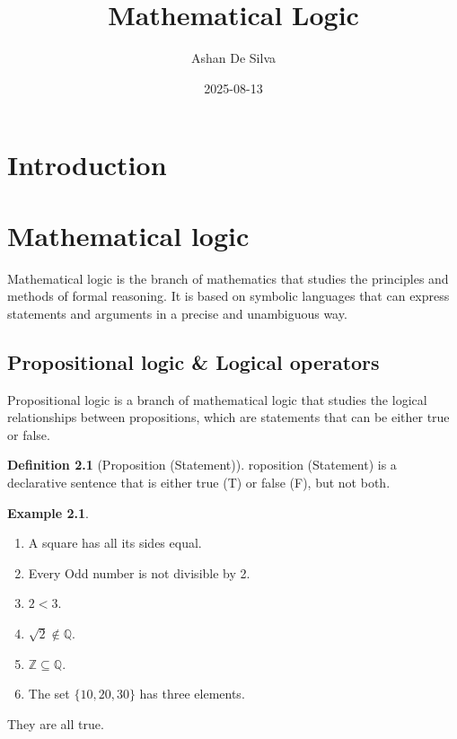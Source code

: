 \documentclass[
]{book}
\title{Mathematical Logic}
\author{Ashan De Silva}
\date{2025-08-13}
\providecommand{\tightlist}{%
  \setlength{\itemsep}{0pt}\setlength{\parskip}{0pt}}
\theoremstyle{definition}
\newtheorem{definition}{Definition}[chapter]
\theoremstyle{definition}
\newtheorem{example}{Example}[chapter]
\theoremstyle{definition}
\theoremstyle{definition}
\theoremstyle{remark}
\begin{document}
\maketitle

{
\setcounter{tocdepth}{1}
\tableofcontents
}
\chapter{Introduction}\label{introduction}

\chapter{Mathematical logic}\label{mathematical-logic}

Mathematical logic is the branch of mathematics that studies the principles and methods of formal reasoning. It is based on symbolic languages that can express statements and arguments in a precise and unambiguous way.

\section{Propositional logic \& Logical operators}\label{propositional-logic-logical-operators}

Propositional logic is a branch of mathematical logic that studies the logical relationships between propositions, which are statements that can be either true or false.

\begin{definition}[Proposition (Statement)]
\protect\hypertarget{def:unnamed-chunk-1}{}\label{def:unnamed-chunk-1}roposition (Statement) is a declarative sentence that is either true (T) or false (F), but not both.
\end{definition}

\begin{example}
\protect\hypertarget{exm:unnamed-chunk-2}{}\label{exm:unnamed-chunk-2}\leavevmode

\begin{enumerate}
\def\labelenumi{(\roman{enumi})}
\tightlist
\item
  A square has all its sides equal.
\item
  Every Odd number is not divisible by 2.
\item
  \(2 < 3\).
\item
  \(\sqrt{2}\not\in \mathbb{Q}\).
\item
  \(\mathbb{Z}\subseteq \mathbb{Q}\).
\item
  The set \(\{10, 20, 30\}\) has three elements.
\end{enumerate}

They are all true.

\end{example}
\end{document}
